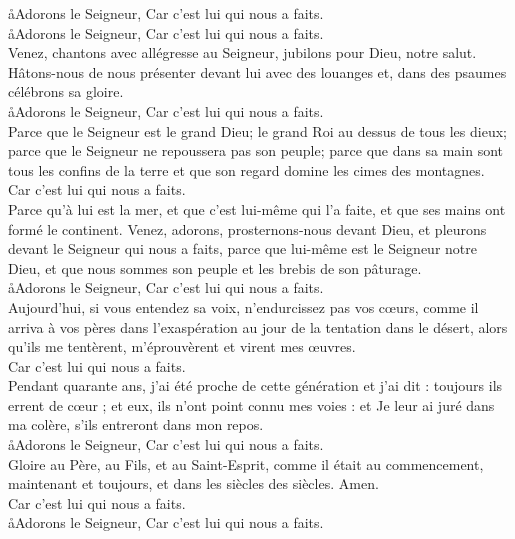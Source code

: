 \documentclass[twoside]{article}
\begin{document}
\begin{paracol}[1]{2}
\aa Adorons le Seigneur, \GreSpecial{*} Car c'est lui qui nous a faits.\\
\aa Adorons le Seigneur, \GreSpecial{*} Car c'est lui qui nous a faits.\\
\vv Venez, chantons avec allégresse au Seigneur, jubilons pour Dieu, notre salut. Hâtons-nous de nous présenter devant lui avec des louanges et, dans des psaumes célébrons sa gloire.\\
\newpage
\aa Adorons le Seigneur, \GreSpecial{*} Car c'est lui qui nous a faits.\\
\vv Parce que le Seigneur est le grand Dieu; le grand Roi au dessus de tous les dieux; parce que le Seigneur ne repoussera pas son peuple; parce que dans sa main sont tous les confins de la terre et que son regard domine les cimes des montagnes.\\
\GreSpecial{*} Car c'est lui qui nous a faits.\\
\vv Parce qu'à lui est la mer, et que c'est lui-même qui l'a faite, et que ses mains ont formé le continent.  Venez, adorons, prosternons-nous devant Dieu, et pleurons devant le Seigneur qui nous a faits,  parce que lui-même est le Seigneur notre Dieu, et que nous sommes son peuple et les brebis de son pâturage.\\
\newpage
\aa Adorons le Seigneur, \GreSpecial{*} Car c'est lui qui nous a faits.\\
\vv Aujourd'hui, si vous entendez sa voix, n'endurcissez pas vos cœurs, comme il arriva à vos pères dans l'exaspération au jour de la tentation dans le désert, alors qu'ils me tentèrent, m'éprouvèrent et virent mes œuvres.\\
\GreSpecial{*} Car c'est lui qui nous a faits.\\
\vv Pendant quarante ans, j'ai été proche de cette génération et j'ai dit : toujours ils errent de cœur ; et eux, ils n'ont point connu mes voies : et Je leur ai juré dans ma colère, s'ils entreront dans mon repos.\\
\aa Adorons le Seigneur, \GreSpecial{*} Car c'est lui qui nous a faits.\\
\vv Gloire au Père, au Fils, et au Saint-Esprit, comme il était au commencement, maintenant et toujours, et dans les siècles des siècles. Amen.\\
\GreSpecial{*} Car c'est lui qui nous a faits.\\
\aa Adorons le Seigneur, \GreSpecial{*} Car c'est lui qui nous a faits.\\


\end{paracol}
\end{document}
